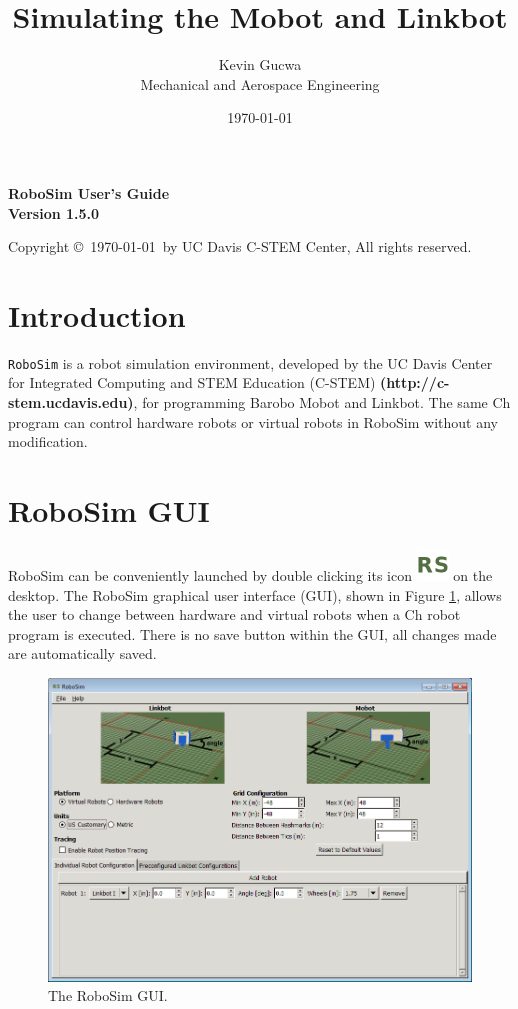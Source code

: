 \documentclass{article}
\title{Simulating the Mobot and Linkbot}
\author{Kevin Gucwa\\Mechanical and Aerospace Engineering}
\date{\today}
\begin{document}
\begin{center}
{\Huge\sf\bf RoboSim User's Guide}\\
\vspace*{2.5cm}
{\Large\bf Version 1.5.0}
\vspace{4in}

Copyright \copyright\ \today\ by UC Davis C-STEM Center, All rights reserved.

\end{center}

\newpage
\tableofcontents
\newpage

\section{Introduction}
\texttt{RoboSim} is a robot simulation environment, developed by the UC Davis
Center for Integrated Computing and STEM Education (C-STEM) {\color{blue} \bf
(http://c-stem.ucdavis.edu)}, for programming Barobo Mobot and Linkbot.  The
same Ch program  can control hardware robots or virtual robots in RoboSim
without any modification.

\section{RoboSim GUI}
\label{sec:gui}
RoboSim can be conveniently launched by double clicking its icon
\includegraphics[height=24pt]{images/robosim} on the desktop.  The RoboSim
graphical user interface (GUI), shown in Figure \ref{fig:gui}, allows the user
to change between hardware and virtual robots when a Ch robot program is
executed.  There is no save button within the GUI, all changes made are
automatically saved.
\begin{figure}[H]
	\begin{center}
		\includegraphics[width=6in]{images/gui}
	\end{center}
	\caption{The RoboSim GUI.}
	\label{fig:gui}
\end{figure}
\end{document}
